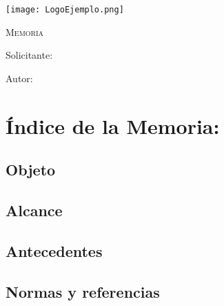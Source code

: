\documentclass[main]{subfiles}
\begin{document}
\newpage
\thispagestyle{empty}
\begin{center}
    \centering
    \texttt{[image: LogoEjemplo.png]} \par
    \vspace{3 cm}
    {\scshape\Huge Memoria \par}
    \vspace{1.5cm}
    {\itshape\Huge \TituloProyecto \par}
    \vfill
    {\Large Solicitante:  \Solicitante \par}
    \vspace{0.5cm}
    {\Large Autor:  \Autor \par}
    \vspace{1.5cm}
    {\Large \Fecha \par}
\end{center}


\chapter*{Índice de la Memoria:}
\newpage
{}

\section{Objeto}

\section{Alcance}

\section{Antecedentes}

\section{Normas y referencias}
\end{document}
